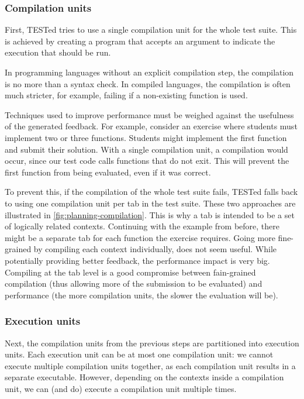\documentclass[../main]{subfiles}
\begin{document}
\subsubsection{Compilation units}
\label{subsubsec:compilation-units}

First, TESTed tries to use a single compilation unit for the whole test suite.
This is achieved by creating a program that accepts an argument to indicate the execution that should be run.

In programming languages without an explicit compilation step, the compilation is no more than a syntax check.
In compiled languages, the compilation is often much stricter, for example, failing if a non-existing function is used.

Techniques used to improve performance must be weighed against the usefulness of the generated feedback.
For example, consider an exercise where students must implement two or three functions.
Students might implement the first function and submit their solution.
With a single compilation unit, a compilation would occur, since our test code calls functions that do not exit.
This will prevent the first function from being evaluated, even if it was correct.

To prevent this, if the compilation of the whole test suite fails, TESTed falls back to using one compilation unit per tab in the test suite.
These two approaches are illustrated in \vref{fig:planning-compilation}.
This is why a tab is intended to be a set of logically related contexts.
Continuing with the example from before, there might be a separate tab for each function the exercise requires.
Going more fine-grained by compiling each context individually, does not seem useful.
While potentially providing better feedback, the performance impact is very big.
Compiling at the tab level is a good compromise between fain-grained compilation (thus allowing more of the submission to be evaluated) and performance (the more compilation units, the slower the evaluation will be).

\subsubsection{Execution units}

Next, the compilation units from the previous steps are partitioned into execution units.
Each execution unit can be at most one compilation unit: we cannot execute multiple compilation units together,
as each compilation unit results in a separate executable.
However, depending on the contexts inside a compilation unit, we can (and do) execute a compilation unit multiple times.
\end{document}
